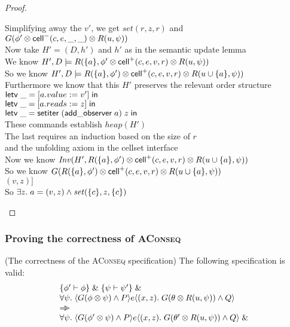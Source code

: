 \begin{proof}
\begin{tabbedproof}
\ooo Simplifying away the $v'$, we get $\mathit{set}(r, z, r)$ and $G(\phi' \otimes \mathsf{cell}^{-}({c}, {e}, {\_}, {\_}) \otimes R(u, \psi))$ \\
\ooo Now take $H' = (D,h')$ and $h'$ as in the semantic update lemma \\
\ooo We know $H', D \models R(\{{a}\}, \phi' \otimes \mathsf{cell}^{+}({c}, {e}, {v}, {r}) \otimes R(u, \psi))$\\
\ooo So we know $H', D \models R(\{{a}\}, \phi') \otimes \mathsf{cell}^{+}({c}, {e}, {v}, {r}) \otimes R(u \cup \{{a}\}, \psi))$ \\
\ooo Furthermore we know that this $H'$ preserves the relevant order structure \\
\ooo $\mathsf{letv}\;\_ = [a.value := v']\;\mathsf{in}\;$ \\
\ooo $\mathsf{letv}\;\_ = [a.reads := z]\;\mathsf{in}\;$ \\
\ooo $\mathsf{letv}\;\_ = \mathsf{setiter}\;(\mathsf{add\_observer}\;a)\;z\;\mathsf{in}\;$ \\
\ooo These commands establish $\mathit{heap}(H')$ \\
\ooo The last requires an induction based on the size of $r$ \\ 
\oox and the unfolding axiom in the cellset interface \\
\ooo Now we know $\mathit{Inv}(H', R(\{{a}\}, \phi') \otimes \mathsf{cell}^{+}({c}, {e}, {v}, {r}) \otimes R(u \cup \{{a}\}, \psi))$ \\
\ooo So we know $G(R(\{{a}\}, \phi') \otimes \mathsf{cell}^{+}({c}, {e}, {v}, {r}) \otimes R(u \cup \{{a}\}, \psi))$ \\
\ooo $(v, z)]$ \\
\ooo So $\exists z.\;a = (v,z) \land \mathit{set}(\{{c}\}, z, \{{c}\})$ 
\end{tabbedproof}
\end{proof}

\subsubsection{Proving the correctness of \textsc{AConseq}}

\begin{prop*}{(The correctness of the \textsc{AConseq} specification)}
The following specification is valid:
\begin{displaymath}
\begin{array}{l}
\{{\phi' \vdash \phi}\} \;\&\; \{{\psi \vdash \psi'}\} \;\&\; \\
\forall \psi.\; \langle{G(\phi \otimes \psi) \land P}\rangle{e}\langle{(x,z)}.\;{G(\theta\otimes R(u, \psi)) \land Q}\rangle \\
\Rightarrow\!\!\!> \\
\forall \psi.\; \langle{G(\phi' \otimes \psi) \land P}\rangle{e}\langle{(x,z)}.\;{G(\theta'\otimes R(u, \psi)) \land Q}\rangle \;\&\; \\
\end{array}
\end{displaymath}
\end{prop*}


